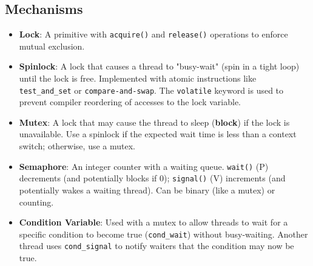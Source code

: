 \documentclass[8pt,a4paper]{article}
\begin{document}
\begin{multicols}{2}
\subsection*{Mechanisms}
\begin{itemize}
    \item \textbf{Lock}: A primitive with \texttt{acquire()} and \texttt{release()} operations to enforce mutual exclusion.
    \item \textbf{Spinlock}: A lock that causes a thread to "busy-wait" (spin in a tight loop) until the lock is free. Implemented with atomic instructions like \texttt{test\_and\_set} or \texttt{compare-and-swap}. The \texttt{volatile} keyword is used to prevent compiler reordering of accesses to the lock variable.
    \item \textbf{Mutex}: A lock that may cause the thread to sleep (\textbf{block}) if the lock is unavailable. Use a spinlock if the expected wait time is less than a context switch; otherwise, use a mutex.
    \item \textbf{Semaphore}: An integer counter with a waiting queue. \texttt{wait()} (P) decrements (and potentially blocks if 0); \texttt{signal()} (V) increments (and potentially wakes a waiting thread). Can be binary (like a mutex) or counting.
    \item \textbf{Condition Variable}: Used with a mutex to allow threads to wait for a specific condition to become true (\texttt{cond\_wait}) without busy-waiting. Another thread uses \texttt{cond\_signal} to notify waiters that the condition may now be true.
\end{itemize}


\end{multicols}
\end{document}

